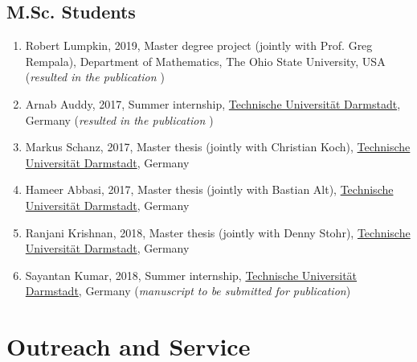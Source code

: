 \documentclass[11pt,a4paper,sans]{moderncv}        %
\begin{document}
\subsection{M.Sc. Students}
\begin{enumerate}
\item Robert Lumpkin, 2019, Master degree project (jointly with Prof. Greg Rempala), Department of Mathematics, The Ohio State University, USA (\emph{resulted in the publication \cite{biomath2019}})
\item Arnab Auddy, 2017, Summer internship, \href{http://www.tu-darmstadt.de/index.en.jsp}{Technische Universit\"{a}t Darmstadt}, Germany (\emph{resulted in the publication \cite{KhudaBukhsh2018Lumpability}})
\item Markus Schanz, 2017, Master thesis (jointly with Christian Koch), \href{http://www.tu-darmstadt.de/index.en.jsp}{Technische Universit\"{a}t Darmstadt}, Germany
\item Hameer Abbasi, 2017, Master thesis (jointly with Bastian Alt), \href{http://www.tu-darmstadt.de/index.en.jsp}{Technische Universit\"{a}t Darmstadt}, Germany
\item Ranjani Krishnan, 2018, Master thesis (jointly with Denny Stohr), \href{http://www.tu-darmstadt.de/index.en.jsp}{Technische Universit\"{a}t Darmstadt}, Germany
\item Sayantan Kumar, 2018, Summer internship, \href{http://www.tu-darmstadt.de/index.en.jsp}{Technische Universit\"{a}t Darmstadt}, Germany (\emph{manuscript to be submitted for publication})
\end{enumerate}

%




\section{Outreach and Service}
\end{document}

